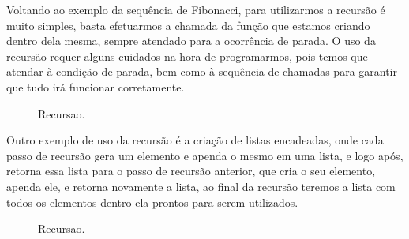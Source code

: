 \documentclass[rel_mlp]{iiufrgs}
\newcommand{\fonte}[1]{\\Fonte: {#1}}
\begin{document}
	Voltando ao exemplo da sequência de Fibonacci, para utilizarmos a recursão é muito simples, basta efetuarmos a chamada da função que estamos criando dentro dela mesma, sempre atendado para a ocorrência de parada. O uso da recursão requer alguns cuidados na hora de programarmos, pois temos que atendar à condição de parada, bem como à sequência de chamadas para garantir que tudo irá funcionar corretamente.
	
	\begin{figure}[htb]
    \centering
    \label{fig:figura1}
    \caption{Recursao.}
\end{figure}

	Outro exemplo de uso da recursão é a criação de listas encadeadas, onde cada passo de recursão gera um elemento e apenda o mesmo em uma lista, e logo após, retorna essa lista para o passo de recursão anterior, que cria o seu elemento, apenda ele, e retorna novamente a lista, ao final da recursão teremos a lista com todos os elementos dentro ela prontos para serem utilizados.

\begin{figure}[htb]
    \centering
    \label{fig:figura1}
    \caption{Recursao.}
\end{figure}
\end{document}
